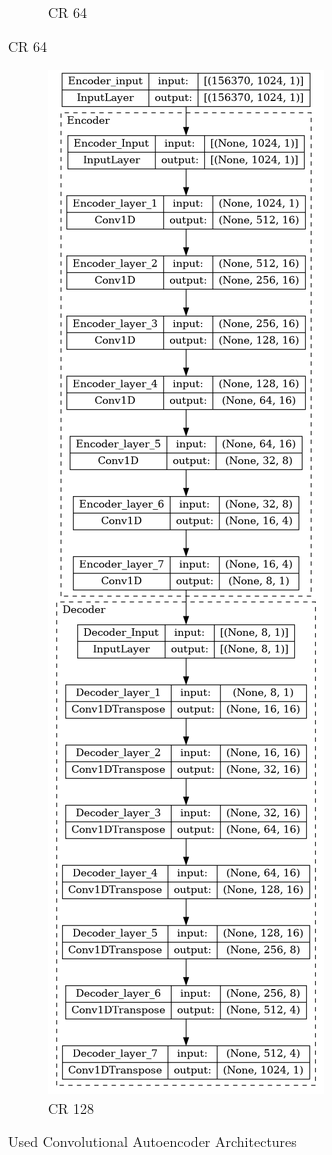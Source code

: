 \begin{appendices}
\begin{figure}
\begin{subfigure}{.49\textwidth}
			\caption{CR 64}
		\end{subfigure}
	\end{figure}
	\begin{figure}
		\ContinuedFloat 
		\begin{subfigure}{.5\textwidth}
			\includegraphics[height=\textheight]{../../Images/CR_128.png}
			\caption{CR 128}
		\end{subfigure}
	\caption{Used Convolutional Autoencoder Architectures}
	\label{appendix:convAutoencoderArchitectures}
	\end{figure}
\FloatBarrier


\end{appendices}
